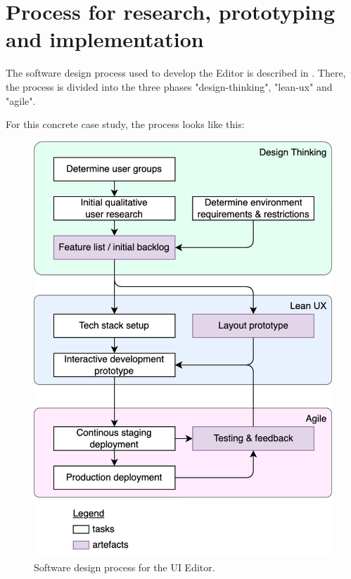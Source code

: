 \newpage
\section{Process for research, prototyping and implementation}

The software design process used to develop the Editor is described in \cite[p. 104]{LearnHCI:2020ys}.
There, the process is divided into the three phases "\Gls{design-thinking}", "\Gls{lean-ux}" and "\Gls{agile}".

For this concrete case study, the process looks like this:
\begin{figure}[h]
  \centering
  \includegraphics[width=0.8\linewidth]{pics/process.drawio.png}
  \caption{Software design process for the UI Editor.}
	\label{fig:process}
\end{figure}

